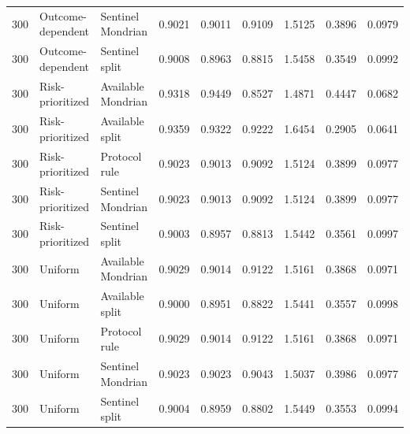 \begin{tabular}{rllrrrrrr}
300 & Outcome-dependent & Sentinel Mondrian & 0.9021 & 0.9011 & 0.9109 & 1.5125 & 0.3896 & 0.0979 \\
300 & Outcome-dependent & Sentinel split & 0.9008 & 0.8963 & 0.8815 & 1.5458 & 0.3549 & 0.0992 \\
300 & Risk-prioritized & Available Mondrian & 0.9318 & 0.9449 & 0.8527 & 1.4871 & 0.4447 & 0.0682 \\
300 & Risk-prioritized & Available split & 0.9359 & 0.9322 & 0.9222 & 1.6454 & 0.2905 & 0.0641 \\
300 & Risk-prioritized & Protocol rule & 0.9023 & 0.9013 & 0.9092 & 1.5124 & 0.3899 & 0.0977 \\
300 & Risk-prioritized & Sentinel Mondrian & 0.9023 & 0.9013 & 0.9092 & 1.5124 & 0.3899 & 0.0977 \\
300 & Risk-prioritized & Sentinel split & 0.9003 & 0.8957 & 0.8813 & 1.5442 & 0.3561 & 0.0997 \\
300 & Uniform & Available Mondrian & 0.9029 & 0.9014 & 0.9122 & 1.5161 & 0.3868 & 0.0971 \\
300 & Uniform & Available split & 0.9000 & 0.8951 & 0.8822 & 1.5441 & 0.3557 & 0.0998 \\
300 & Uniform & Protocol rule & 0.9029 & 0.9014 & 0.9122 & 1.5161 & 0.3868 & 0.0971 \\
300 & Uniform & Sentinel Mondrian & 0.9023 & 0.9023 & 0.9043 & 1.5037 & 0.3986 & 0.0977 \\
300 & Uniform & Sentinel split & 0.9004 & 0.8959 & 0.8802 & 1.5449 & 0.3553 & 0.0994 \\
\bottomrule
\end{tabular}
